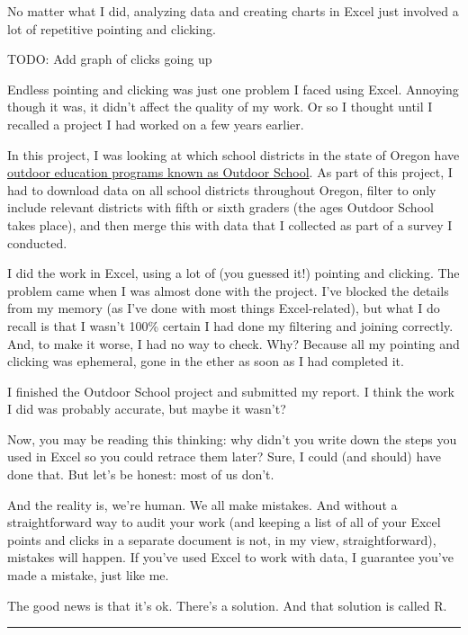 \documentclass[
]{book}
\begin{document}
No matter what I did, analyzing data and creating charts in Excel just involved a lot of repetitive pointing and clicking.

TODO: Add graph of clicks going up

Endless pointing and clicking was just one problem I faced using Excel. Annoying though it was, it didn't affect the quality of my work. Or so I thought until I recalled a project I had worked on a few years earlier.

In this project, I was looking at which school districts in the state of Oregon have \href{https://oregonstate.app.box.com/s/83g5sjdm88xgqdxfze0ri7qo4uff5sj7}{outdoor education programs known as Outdoor School}. As part of this project, I had to download data on all school districts throughout Oregon, filter to only include relevant districts with fifth or sixth graders (the ages Outdoor School takes place), and then merge this with data that I collected as part of a survey I conducted.

I did the work in Excel, using a lot of (you guessed it!) pointing and clicking. The problem came when I was almost done with the project. I've blocked the details from my memory (as I've done with most things Excel-related), but what I do recall is that I wasn't 100\% certain I had done my filtering and joining correctly. And, to make it worse, I had no way to check. Why? Because all my pointing and clicking was ephemeral, gone in the ether as soon as I had completed it.

I finished the Outdoor School project and submitted my report. I think the work I did was probably accurate, but maybe it wasn't?

Now, you may be reading this thinking: why didn't you write down the steps you used in Excel so you could retrace them later? Sure, I could (and should) have done that. But let's be honest: most of us don't.

And the reality is, we're human. We all make mistakes. And without a straightforward way to audit your work (and keeping a list of all of your Excel points and clicks in a separate document is not, in my view, straightforward), mistakes will happen. If you've used Excel to work with data, I guarantee you've made a mistake, just like me.

The good news is that it's ok. There's a solution. And that solution is called R.

\begin{center}\rule{0.5\linewidth}{0.5pt}\end{center}
\end{document}

